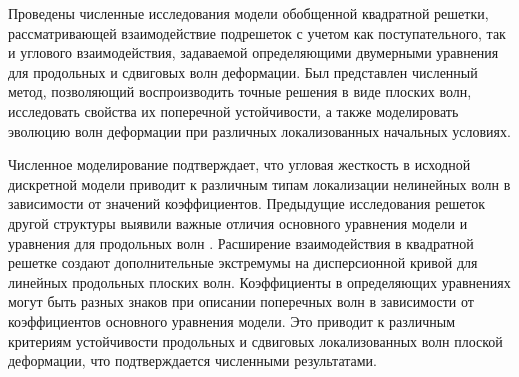 Проведены численные исследования модели обобщенной квадратной решетки, рассматривающей взаимодействие подрешеток с учетом как поступательного, так и углового взаимодействия, задаваемой определяющими двумерными уравнения для продольных и сдвиговых волн деформации. Был представлен численный метод, позволяющий воспроизводить точные решения в виде плоских волн, исследовать свойства их поперечной устойчивости, а также моделировать эволюцию волн деформации при различных локализованных начальных условиях.

Численное моделирование подтверждает, что угловая жесткость в исходной дискретной модели приводит к различным типам локализации нелинейных волн в зависимости от значений коэффициентов. Предыдущие исследования решеток другой структуры выявили важные отличия основного уравнения модели и уравнения для продольных волн \cite{porkros}.
Расширение взаимодействия в квадратной решетке создают дополнительные экстремумы на дисперсионной кривой для линейных продольных плоских волн. 
Коэффициенты в определяющих уравнениях могут быть разных знаков при описании поперечных волн в зависимости от коэффициентов основного уравнения модели. Это приводит к различным критериям устойчивости продольных и сдвиговых локализованных волн плоской деформации, что подтверждается численными результатами.

